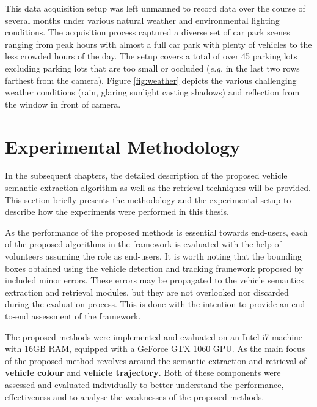 This data acquisition setup was left unmanned to record data over the course of several months under various natural weather and environmental lighting conditions. The acquisition process captured a diverse set of car park scenes ranging from peak hours with almost a full car park with plenty of vehicles to the less crowded hours of the day. 
The setup covers a total of over 45 parking lots excluding parking lots that are too small or occluded (\emph{e.g.} in the last two rows farthest from the camera). Figure \ref{fig:weather} depicts the various challenging weather conditions (rain, glaring sunlight casting shadows) and reflection from the window in front of camera. 


\section{Experimental Methodology}
\label{sec:expmethodology}

In the subsequent chapters, the detailed description of the proposed vehicle semantic extraction algorithm as well as the retrieval techniques will be provided. This section briefly presents the methodology and the experimental setup to describe how the experiments were performed in this thesis.

As the performance of the proposed methods is essential towards end-users, each of the proposed algorithms in the framework is evaluated with the help of volunteers assuming the role as end-users.
It is worth noting that the bounding boxes obtained using the vehicle detection and tracking framework proposed by \cite{lim2017} included minor errors. These errors may be propagated to the vehicle semantics extraction and retrieval modules, but they are not overlooked nor discarded during the evaluation process. This is done with the intention to provide an end-to-end assessment of the framework.

The proposed methods were implemented and evaluated on an Intel i7 machine with 16GB RAM, equipped with a GeForce GTX 1060 GPU. As the main focus of the proposed method revolves around the semantic extraction and retrieval of \textbf{vehicle colour} and \textbf{vehicle trajectory}. Both of these components were assessed and evaluated individually to better understand the performance, effectiveness and to analyse the weaknesses of the proposed methods.

